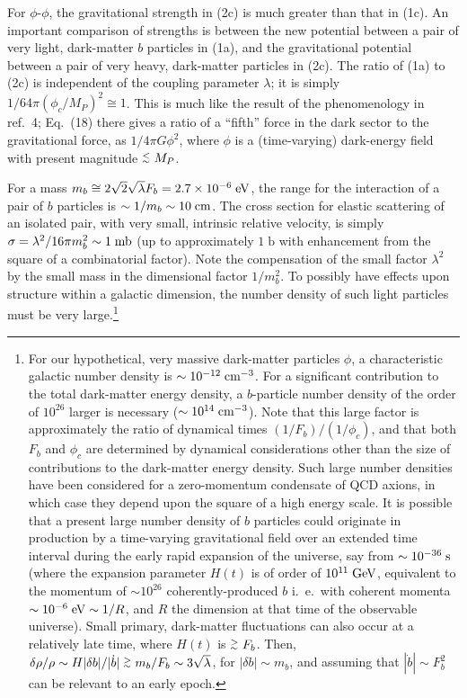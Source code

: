 For $\phi$-$\phi$, the gravitational strength in (2c) is much greater than that in (1c). An important comparison
of strengths is between the new potential between a pair of very light, dark-matter $b$ particles in (1a), and the
gravitational potential between a pair of very heavy, dark-matter particles in (2c). The ratio of (1a) to (2c) is 
independent of the coupling parameter $\lambda$; it is simply $1/64\pi (\phi_c/M_P)^2 \cong 1 $. This is much 
like the result of the phenomenology in ref.~4; Eq.~(18) there gives a ratio  of a ``fifth'' force in the dark
sector to the gravitational force, as $1/4\pi G\phi^2$, where $\phi$ is a (time-varying) dark-energy field
with present magnitude $\stackrel{<}{{}_\sim} M_P$. 

For a mass $m_b \cong 2\sqrt{2}\sqrt{\lambda}F_b = 2.7\times 10^{-6}\;\mbox{eV}$, the range for the interaction of a pair
of $b$ particles is $\sim 1/m_b \sim 10\;\mbox{cm}$. The cross section for elastic scattering of an isolated pair,
with very small, intrinsic relative velocity, is simply $\sigma = \lambda^2/16\pi m_b^2 \sim 1\;\mbox{mb}$ (up to approximately
$1\;{\mathrm{b}}$ with enhancement from the square of a combinatorial factor). Note the compensation
of the small factor $\lambda^2$ by the small mass in the dimensional factor $1/m_b^2$. To possibly have effects upon structure
within a galactic dimension, the number density of such light particles must be very large.\footnote{
For our hypothetical, very massive dark-matter particles $\phi$, a characteristic galactic number density is
$\sim 10^{-12} \;\mbox{cm}^{-3}$. For a significant contribution to the total dark-matter energy density, a $b$-particle
number density of the order of $10^{26}$ larger is necessary ($\sim 10^{14}\;\mbox{cm}^{-3}$). Note that this large
factor is approximately the ratio of dynamical times $(1/F_b)/(1/\phi_c)$, and that both $F_b$ and $\phi_c$ are
determined by dynamical considerations other than the size of contributions to the dark-matter energy density. \cite{ref1,ref2}
Such large number densities have been considered for a zero-momentum condensate of QCD axions, in which case they
depend upon the square of a high energy scale. It is possible that a present large number density of $b$ particles
could originate in production by a time-varying gravitational field \cite{ref8} over an extended time interval
during the early rapid expansion of the universe, say from $\sim 10^{-36}\;\mbox{s}$ \cite{ref1} (where the expansion
parameter $H(t)$ is of order of $10^{11}\;\mbox{GeV}$, equivalent to the momentum of $\sim 10^{26}$ coherently-produced
$b$ i.~e.~with coherent momenta $\sim 10^{-6}\;\mbox{eV} \sim 1/R$, and $R$ the dimension at that time of the observable
universe). Small primary, dark-matter fluctuations can also occur at a relatively late time, where $H(t)$ is $\stackrel{>}{{}_\sim} F_b$.
Then, $\delta\rho/\rho \sim H|\delta b|/|\dot{b}| \stackrel{>}{{}_\sim} m_b/F_b \sim 3\sqrt{\lambda}$, for $|\delta b|\sim m_b$,
and assuming that $|\dot{b}|\sim F_b^2$ can be relevant to an early epoch.
}
